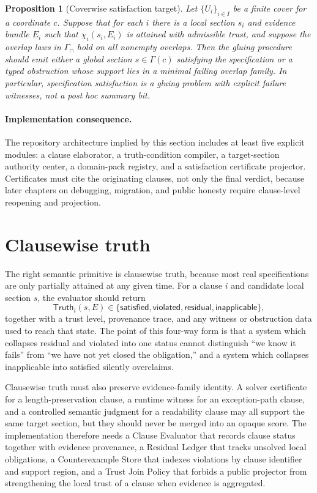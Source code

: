 \documentclass[11pt]{report}
\newtheorem{proposition}[definition]{Proposition}
\newcommand{\Sec}{\Gamma}
\newcommand{\Truth}{\mathsf{Truth}}
\begin{document}
\begin{proposition}[Coverwise satisfaction target]
Let $\{U_i\}_{i\in I}$ be a finite cover for a coordinate $c$. Suppose that for each $i$ there is a local section $s_i$ and evidence bundle $E_i$ such that $\chi_i(s_i,E_i)$ is attained with admissible trust, and suppose the overlap laws in $\Gamma_{\!\cap}$ hold on all nonempty overlaps. Then the gluing procedure should emit either a global section $s\in \Sec(c)$ satisfying the specification or a typed obstruction whose support lies in a minimal failing overlap family. In particular, specification satisfaction is a gluing problem with explicit failure witnesses, not a post hoc summary bit.
\end{proposition}

\paragraph{Implementation consequence.}
The repository architecture implied by this section includes at least five explicit modules: a clause elaborator, a truth-condition compiler, a target-section authority center, a domain-pack registry, and a satisfaction certificate projector. Certificates must cite the originating clauses, not only the final verdict, because later chapters on debugging, migration, and public honesty require clause-level reopening and projection.
\section{Clausewise truth}
The right semantic primitive is clausewise truth, because most real specifications are only partially attained at any given time. For a clause $i$ and candidate local section $s$, the evaluator should return
\[
\Truth_i(s,E)\in \{\mathsf{satisfied},\mathsf{violated},\mathsf{residual},\mathsf{inapplicable}\},
\]
together with a trust level, provenance trace, and any witness or obstruction data used to reach that state. The point of this four-way form is that a system which collapses residual and violated into one status cannot distinguish ``we know it fails'' from ``we have not yet closed the obligation,'' and a system which collapses inapplicable into satisfied silently overclaims.

Clausewise truth must also preserve evidence-family identity. A solver certificate for a length-preservation clause, a runtime witness for an exception-path clause, and a controlled semantic judgment for a readability clause may all support the same target section, but they should never be merged into an opaque score. The implementation therefore needs a Clause Evaluator that records clause status together with evidence provenance, a Residual Ledger that tracks unsolved local obligations, a Counterexample Store that indexes violations by clause identifier and support region, and a Trust Join Policy that forbids a public projector from strengthening the local trust of a clause when evidence is aggregated.
\end{document}
